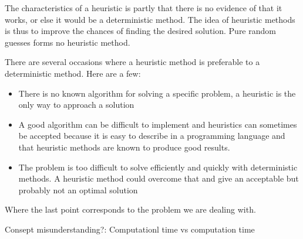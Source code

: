 The characteristics of a heuristic is partly that there is no evidence of that it works, or else it would be a deterministic method. The idea of heuristic methods is thus to improve the chances of finding the desired solution. Pure random guesses forms no heuristic method.

There are several occasions where a heuristic method is preferable to a deterministic method.
Here are a few:

\begin{itemize}
\item There is no known algorithm for solving a specific problem, a heuristic is the only way to approach a solution
\item A good algorithm can be difficult to implement and heuristics can sometimes be accepted because it is easy to describe in a programming language and that heuristic methods are known to produce good results.
\item The problem is too difficult to solve efficiently and quickly with deterministic methods. A heuristic method could overcome that and give an acceptable but probably not an optimal solution
\end{itemize}

Where the last point corresponds to the problem we are dealing with.

Consept misunderstanding?:
Computationl time vs computation time

